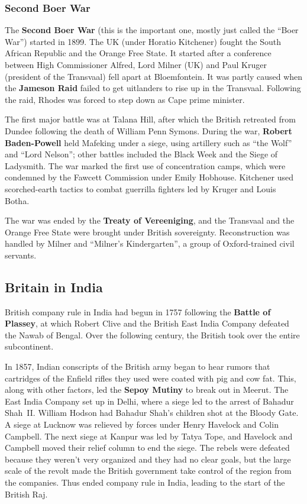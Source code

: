 \subsubsection*{Second Boer War}

The \textbf{Second Boer War} (this is the important one, mostly just called the ``Boer War'') started in 1899.
The UK (under Horatio Kitchener) fought the South African Republic and the Orange Free State.
It started after a conference between High Commissioner Alfred, Lord Milner (UK)
and Paul Kruger (president of the Transvaal)
fell apart at Bloemfontein.
It was partly caused when the \textbf{Jameson Raid} failed to get uitlanders to rise up in the Transvaal.
Following the raid, Rhodes was forced to step down as Cape prime minister.

The first major battle was at Talana Hill,
after which the British retreated from Dundee following the death of William Penn Symons.
During the war, \textbf{Robert Baden-Powell} held Mafeking under a siege,
using artillery such as ``the Wolf'' and ``Lord Nelson'';
other battles included the Black Week and the Siege of Ladysmith.
The war marked the first use of concentration camps,
which were condemned by the Fawcett Commission under Emily Hobhouse.
Kitchener used scorched-earth tactics to combat guerrilla fighters led by Kruger and Louis Botha.

The war was ended by the \textbf{Treaty of Vereeniging},
and the Transvaal and the Orange Free State were brought under British sovereignty.
Reconstruction was handled by Milner and ``Milner's Kindergarten'', a group of Oxford-trained civil servants.

\subsection*{Britain in India}

British company rule in India had begun in 1757 following the \textbf{Battle of Plassey},
at which Robert Clive and the British East India Company defeated the Nawab of Bengal.
Over the following century, the British took over the entire subcontinent.

In 1857, Indian conscripts of the British army began to hear rumors that cartridges of the Enfield rifles they used
were coated with pig and cow fat.
This, along with other factors, led the \textbf{Sepoy Mutiny} to break out in Meerut.
The East India Company set up in Delhi, where a siege led to the arrest of Bahadur Shah~II\@.
William Hodson had Bahadur Shah's children shot at the Bloody Gate.
A siege at Lucknow was relieved by forces under Henry Havelock and Colin Campbell.
The next siege at Kanpur was led by Tatya Tope,
and Havelock and Campbell moved their relief column to end the siege.
The rebels were defeated because they weren't very organized and they had no clear goals,
but the large scale of the revolt made the British government take control of the region from the companies.
Thus ended company rule in India, leading to the start of the British Raj.
